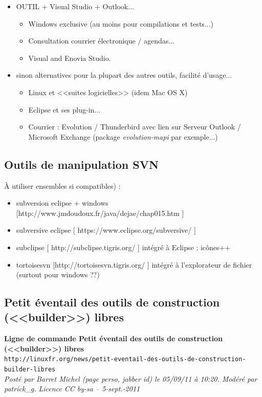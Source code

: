 \documentclass[11pt,twoside,a4paper]{article}
\begin{document}
\begin{itemize}
	\item OUTIL + Visual Studio + Outlook...
	\begin{itemize}
		\item Windows exclusive (au moins pour compilations et tests...)
		\item Consultation courrier {\'e}lectronique / agendas...
		\item Visual and Enovia Studio. 
	\end{itemize}
	\item sinon alternatives pour la plupart des autres outils, facilit{\'e} d'usage...
	\begin{itemize}
		\item Linux et <<suites logicielles>> (idem Mac OS X)
		\item Eclipse et ses plug-in...
		\item Courrier : Evolution / Thunderbird avec lien sur Serveur Outlook / Microsoft Exchange (package \emph{evolution-mapi} par exemple...)
	\end{itemize}
\end{itemize}

\subsection{Outils de manipulation SVN}

{\`A} utiliser ensembles si compatibles) : 
\begin{itemize}
	\item subversion eclipse + windows [http://www.jmdoudoux.fr/java/dejae/chap015.htm ]
	\item subversive eclipse [  https://www.eclipse.org/subversive/ ]
	\item subclipse [ http://subclipse.tigris.org/ ] int{\'e}gr{\'e} {\`a} Eclipse : ic{\^o}nes++
	\item tortoisesvn [http://tortoisesvn.tigris.org/ ] int{\'e}gr{\'e} {\`a} l'explorateur de fichier (surtout pour windows ??)
\end{itemize}


\clearpage

\subsection{Petit {\'e}ventail des outils de construction (<<builder>>) libres}

\textbf{Ligne de commande Petit {\'e}ventail des outils de construction (<<builder>>) libres}~\\
\texttt{http://linuxfr.org/news/petit-eventail-des-outils-de-construction-builder-libres}~\\
\textit{Post{\'e} par Barret Michel (page perso, jabber id) le 05/09/11 {\`a} 10:20. Mod{\'e}r{\'e} par patrick\_g. Licence CC by-sa -- 5-sept.-2011}~\\
\end{document}
